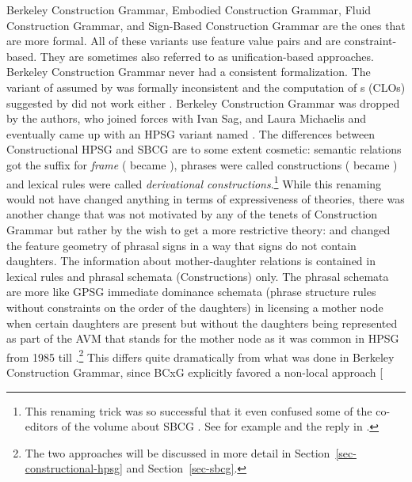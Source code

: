 \documentclass[output=paper]{langsci/langscibook}
\begin{document}
Berkeley Construction Grammar, Embodied Construction Grammar, Fluid Construction Grammar, and
Sign-Based Construction Grammar are the ones that are more formal. All of these variants use feature
value pairs and are constraint-based. They are sometimes also referred to as unification-based
approaches. Berkeley Construction Grammar never had a consistent formalization. The variant of
 assumed by \citet{KF99a} was formally inconsistent \citep[Section~2.4]{Mueller2006d} and the computation of s (CLOs) suggested  by \citet{Kay2002a} did not work either \citep[Section~3]{Mueller2006d}. Berkeley Construction
Grammar was dropped by the authors, who joined forces with Ivan Sag, and Laura Michaelis and eventually
came up with an HPSG variant named \sbcg{} \citep{Sag2012a}. The differences between
Constructional HPSG \citep{Sag97a} and SBCG are to some extent cosmetic: semantic relations got the
suffix  for \emph{frame} ( became ), phrases were called constructions ( became
) and lexical rules were called \emph{derivational constructions}.\footnote{
This renaming trick was so successful that it even confused some of the co-editors of the volume about
SBCG \citep{BS2012a-ed}. See for example  and the reply in .
}
While this renaming would not have changed anything in terms of expressiveness of theories, there
was another change that was not motivated by any of the tenets of Construction Grammar but rather by
the wish to get a more restrictive theory: \citet*{SWB2003a} and \citet{Sag2007a} changed the feature geometry of phrasal
signs in a way that signs do not contain daughters. The information about mother-daughter relations
is contained in lexical rules and phrasal schemata (Constructions) only. The phrasal schemata are
more like GPSG immediate dominance schemata (phrase structure rules without constraints on the order of the daughters) in licensing a mother node when certain daughters are present
but without the daughters being represented as part of the AVM that stands for the mother node as it
was common in HPSG from 1985 till .\footnote{%
  The two approaches will be discussed in more detail in Section~\ref{sec-constructional-hpsg} and Section~\ref{sec-sbcg}.
}
This differs quite dramatically from what was done in Berkeley Construction
Grammar, since BCxG explicitly favored a non-local approach \parencites[]{Fillmore88a}[\page
\end{document}
